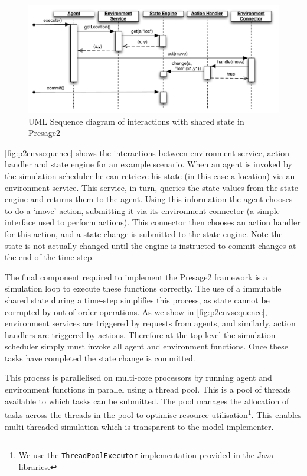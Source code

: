 \begin{figure}
\caption{UML Sequence diagram of interactions with shared state in Presage2}\label{fig:p2envsequence}
\includegraphics[width=\linewidth]{gfx/presage2/environment_sequence}
\end{figure}

\autoref{fig:p2envsequence} shows the interactions between environment
service, action handler and state engine for an example scenario. When an
agent is invoked by the simulation scheduler he can retrieve his state (in
this case a location) via an environment service. This service, in turn,
queries the state values from the state engine and returns them to the agent.
Using this information the agent chooses to do a `move' action, submitting it
via its environment connector (a simple interface used to perform actions).
This connector then chooses an action handler for this action, and a state
change is submitted to the state engine. Note the state is not actually
changed until the engine is instructed to commit changes at the end of the
time-step.

The final component required to implement the Presage2 framework is a
simulation loop to execute these functions correctly. The use of a immutable
shared state during a time-step simplifies this process, as state cannot be
corrupted by out-of-order operations. As we show in
\autoref{fig:p2envsequence}, environment services are triggered by requests
from agents, and similarly, action handlers are triggered by actions.
Therefore at the top level the simulation scheduler simply must invoke all
agent and environment functions. Once these tasks have completed the state
change is committed.

This process is parallelised on multi-core processors by running agent and
environment functions in parallel using a thread pool. This is a pool of
threads available to which tasks can be submitted. The pool manages the
allocation of tasks across the threads in the pool to optimise resource
utilisation\footnote{We use the \texttt{ThreadPoolExecutor} implementation
provided in the Java libraries.}. This enables multi-threaded simulation which
is transparent to the model implementer.

